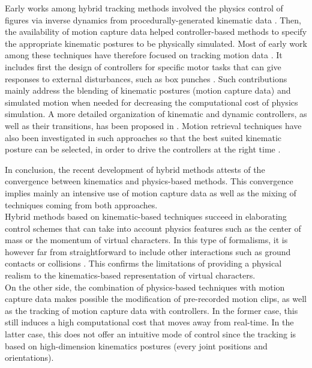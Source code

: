{{Early works among hybrid tracking methods involved the physics control of figures via inverse dynamics from procedurally-generated kinematic data . Then, the availability of motion capture data helped controller-based methods to specify the appropriate kinematic postures to be physically simulated. Most of early work among these techniques have therefore focused on tracking motion data . It includes first the design of controllers for specific motor tasks that can give responses to external disturbances, such as box punches . Such contributions mainly address the blending of kinematic postures (motion capture data) and simulated motion when needed  for decreasing the computational cost of physics simulation. A more detailed organization of kinematic and dynamic controllers, as well as their transitions, has been proposed in . Motion retrieval techniques have also been investigated in such approaches so that the best suited kinematic posture can be selected, in order to drive the controllers at the right time .


				\label{subsubsubsec:CA_MC_Hybrid_Conclusion}

In conclusion, the recent development of hybrid methods attests of the convergence between kinematics and physics-based methods. This convergence implies mainly an intensive use of motion capture data as well as the mixing of techniques coming from both approaches.\\

Hybrid methods based on kinematic-based techniques succeed in elaborating control schemes that can take into account physics features such as the center of mass or the momentum of virtual characters. In this type of formalisms, it is however far from straightforward to include other interactions such as ground contacts or collisions . This confirms the limitations of providing a physical realism to the kinematics-based representation of virtual characters.\\

On the other side, the combination of physics-based techniques with motion capture data makes possible the modification of pre-recorded motion clips, as well as the tracking of motion capture data with controllers. In the former case, this still induces a high computational cost that moves away from real-time. In the latter case, this does not offer an intuitive mode of control since the tracking is based on high-dimension kinematics postures (every joint positions and orientations).


}}
